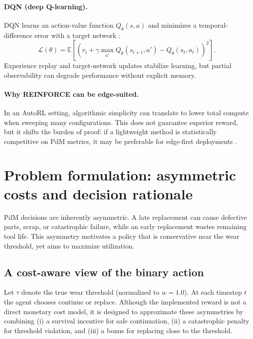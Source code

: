 \documentclass[11pt]{article}
\begin{document}
\paragraph{DQN (deep Q-learning).}
DQN learns an action-value function $Q_\theta(s,a)$ and minimizes a temporal-difference error with a target network \parencite{Mnih2015DQN}:
\begin{equation}
\mathcal{L}(\theta)=\mathbb{E}\left[\left(r_t + \gamma\max_{a'}Q_{\bar\theta}(s_{t+1},a') - Q_\theta(s_t,a_t)\right)^2\right].
\end{equation}
Experience replay and target-network updates stabilize learning, but partial observability can degrade performance without explicit memory.

\paragraph{Why REINFORCE can be edge-suited.}
In an AutoRL setting, algorithmic simplicity can translate to lower total compute when sweeping many configurations. This does not guarantee superior reward, but it shifts the burden of proof: if a lightweight method is statistically competitive on PdM metrics, it may be preferable for edge-first deployments \parencite{Schwartz2020GreenAI, Njor2024TinyML}.

\section{Problem formulation: asymmetric costs and decision rationale}
\label{sec:problem}
PdM decisions are inherently asymmetric. A late replacement can cause defective parts, scrap, or catastrophic failure, while an early replacement wastes remaining tool life. This asymmetry motivates a policy that is conservative near the wear threshold, yet aims to maximize utilization.

\subsection{A cost-aware view of the binary action}
Let $\tau$ denote the true wear threshold (normalized to $w=1.0$). At each timestep $t$ the agent chooses continue or replace. Although the implemented reward is not a direct monetary cost model, it is designed to approximate these asymmetries by combining (i) a survival incentive for safe continuation, (ii) a catastrophic penalty for threshold violation, and (iii) a bonus for replacing close to the threshold.
\end{document}
